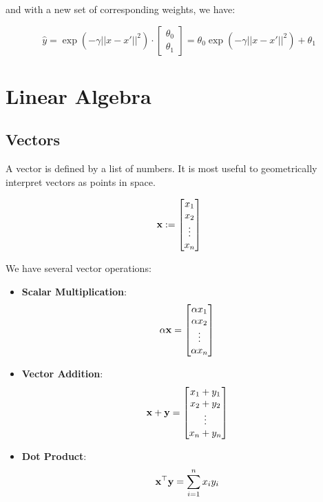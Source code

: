 and with a new set of corresponding weights, we have:

\begin{equation}
    \hat{y} = \exp(-\gamma ||x - x'||^2) \cdot \begin{bmatrix} \theta_0 \\ \theta_1 \end{bmatrix} = \theta_0 \exp(-\gamma ||x - x'||^2) + \theta_1
\end{equation}


\section{Linear Algebra}
\subsection{Vectors}

A vector is defined by a list of numbers. It is most useful to geometrically interpret vectors as points in space.

\begin{equation}
    \mathbf{x} := \begin{bmatrix} x_1 \\ x_2 \\ \vdots \\ x_n \end{bmatrix}
\end{equation}

We have several vector operations:
\begin{itemize}
    \item \textbf{Scalar Multiplication}:
          \begin{equation}
              \alpha \mathbf{x} = \begin{bmatrix} \alpha x_1 \\ \alpha x_2 \\ \vdots \\ \alpha x_n \end{bmatrix}
          \end{equation}

    \item \textbf{Vector Addition}:
          \begin{equation}
              \mathbf{x} + \mathbf{y} = \begin{bmatrix} x_1 + y_1 \\ x_2 + y_2 \\ \vdots \\ x_n + y_n \end{bmatrix}
          \end{equation}

    \item \textbf{Dot Product}:
          \begin{equation}
              \mathbf{x} ^\top \mathbf{y} = \sum^n_{i=1} x_i y_i
          \end{equation}
\end{itemize}



